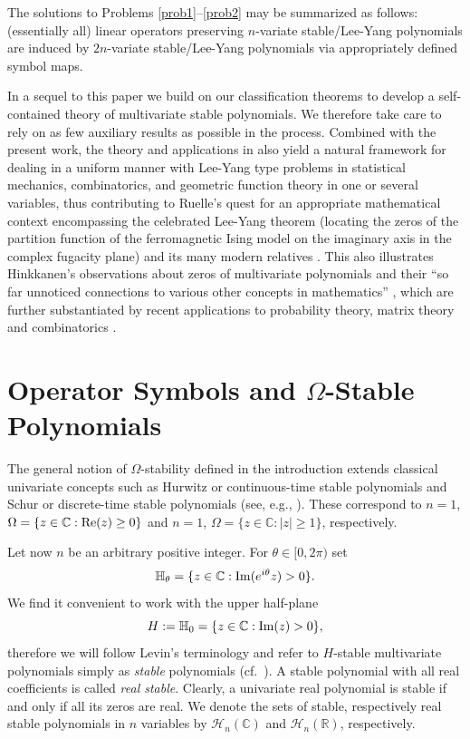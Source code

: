 \documentclass[10pt,reqno]{amsart}
\theoremstyle{plain}
\theoremstyle{definition}
\theoremstyle{remark}
\numberwithin{equation}{section}
\newcommand{\bH}{\mathbb{H}}
\newcommand{\HH}{\mathcal{H}}
\newcommand{\RR}{\mathbb{R}}
\newcommand{\CC}{\mathbb{C}}
\newcommand{\te}{\theta}
\renewcommand{\Im}{{\rm Im}}
\renewcommand{\Re}{{\rm Re}}
\begin{document}
The solutions to Problems \ref{prob1}--\ref{prob2} 
may be summarized as follows: (essentially all) linear operators 
preserving $n$-variate stable/Lee-Yang polynomials are induced by 
$2n$-variate stable/Lee-Yang 
polynomials via appropriately defined symbol maps. 
 
In a sequel \cite{BB-II} to this paper 
we build on our classification theorems 
to develop a self-contained theory of 
multivariate stable polynomials. We therefore take care to rely on as 
few auxiliary results as possible in the process. 
Combined with the 
present work, the theory and applications in \cite{BB-II} also yield 
a natural framework for dealing in a uniform manner with 
Lee-Yang type problems in statistical mechanics, combinatorics, and geometric
function theory in one or several variables, thus contributing to  
Ruelle's quest \cite{ruelle2} for an appropriate mathematical 
context encompassing the celebrated Lee-Yang theorem \cite{LY} 
(locating the zeros of 
the partition function of the ferromagnetic Ising model on the imaginary axis 
in the complex fugacity plane) and its many modern relatives 
\cite{As,beau,BBCK,BBCKK,HL,KOS,LS,new1,new2,ruelle1,ruelle4,sco-sok}. 
This also illustrates Hinkkanen's observations about zeros of multivariate 
polynomials and 
their ``so far unnoticed connections to various other concepts in 
mathematics'' \cite{hink}, which are further substantiated by recent 
applications to probability theory, matrix theory and combinatorics 
\cite{BBS2,BBL,Br1,COSW,Lig1,ruelle-g2,sok2,W2}.

\section{Operator Symbols and $\Omega$-Stable Polynomials}\label{new-s-prel}

The general notion of $\Omega$-stability defined in the introduction extends 
classical univariate concepts such as Hurwitz or continuous-time 
stable polynomials and Schur or discrete-time stable polynomials 
(see, e.g., \cite{M,RS}). These correspond to $n=1$, 
$\Omega=\{z \in \CC : \Re(z) \ge 0\}$ and $n=1$, 
$\Omega=\{z \in \CC : |z|\ge 1\}$, respectively.

Let now $n$ be an arbitrary positive integer. For $\te\in [0,2\pi)$ set
$$ 
\bH_\te=\{z \in \CC: \Im(e^{i\te}z)>0\}.
$$
We find it convenient to work with the upper half-plane 
$$
H:=\bH_0=\{z \in \CC: \Im(z)>0\},
$$
therefore we will follow Levin's terminology \cite{Le} and refer to 
$H$-stable multivariate polynomials simply 
as {\em stable} polynomials (cf.~\cite{BBS1,BBS2,BBS3,BBL}). 
A stable polynomial with all real coefficients is called {\em real stable}. 
Clearly, a univariate 
real polynomial is stable if and only if all its zeros are real. 
We denote the sets of stable, respectively
real stable polynomials in $n$ variables by $\HH_n(\CC)$ and $\HH_n(\RR)$,
respectively.
\end{document}
